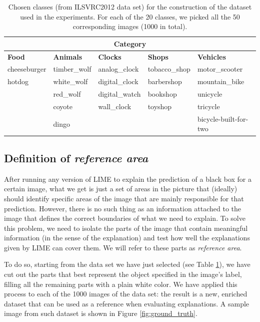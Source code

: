 \documentclass[12pt, twoside, a4paper]{report}
\begin{document}
\begin{table}[]
\def\arraystretch{1.2}
\begin{tabularx}{\textwidth}{|XXXXp{2.5cm}|}
\hline
\multicolumn{5}{|c|}{\textbf{Category}} \\ \hline

\textbf{Food} & 
\textbf{Animals} & 
\textbf{Clocks} & 
\textbf{Shops} & 
\textbf{Vehicles} \\ \hline

cheeseburger & timber\_wolf & analog\_clock & tobacco\_shop & motor\_scooter \\
hotdog & white\_wolf & digital\_clock & barbershop & mountain\_bike \\
 & red\_wolf & digital\_watch & bookshop & unicycle \\
 & coyote & wall\_clock & toyshop & tricycle \\
 & dingo &  &  & bicycle-built-for-two \\ \hline
\end{tabularx}
\caption{Chosen classes (from ILSVRC2012 data set) for the construction of the dataset used in the experiments. For each of the 20 classes, we picked all the 50 corresponding images (1000 in total).}
\label{tab:chosen_classes}
\end{table}

\subsection{Definition of \textit{reference area}}

After running any version of LIME to explain the prediction of a black box for a certain image, what we get is just a set of areas in the picture that (ideally) should identify specific areas of the image that are mainly responsible for that prediction. However, there is no such thing as an information attached to the image that defines the correct boundaries of what we need to explain. To solve this problem, we need to isolate the parts of the image that contain meaningful information (in the sense of the explanation) and test how well the explanations given by LIME can cover them. We will refer to these parts as \textit{reference area}. 

To do so, starting from the data set we have just selected (see Table \ref{tab:chosen_classes}), we have cut out the parts that best represent the object specified in the image's label, filling all the remaining parts with a plain white color. We have applied this process to each of the 1000 images of the data set: the result is a new, enriched dataset that can be used as a reference when evaluating explanations. A sample image from such dataset is shown in Figure \ref{fig:ground_truth}.
\end{document}
